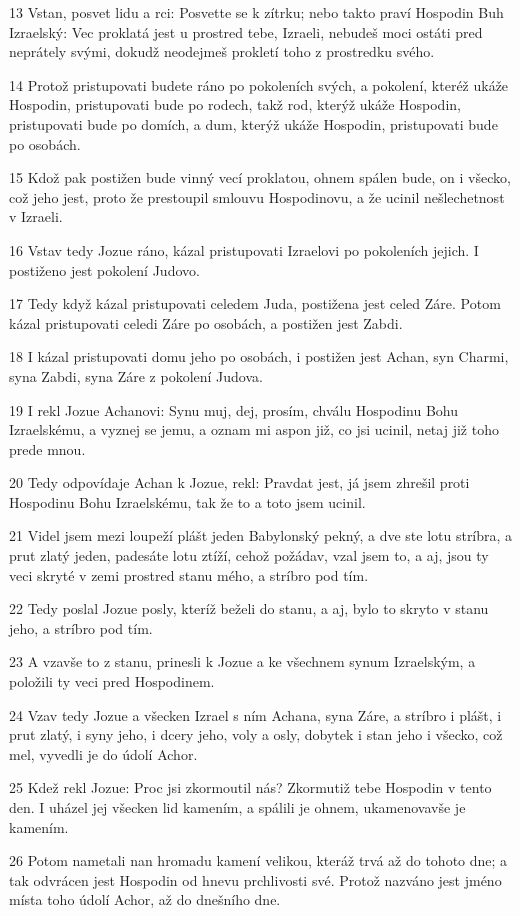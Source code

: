 \par 13 Vstan, posvet lidu a rci: Posvette se k zítrku; nebo takto praví Hospodin Buh Izraelský: Vec proklatá jest u prostred tebe, Izraeli, nebudeš moci ostáti pred neprátely svými, dokudž neodejmeš prokletí toho z prostredku svého.
\par 14 Protož pristupovati budete ráno po pokoleních svých, a pokolení, kteréž ukáže Hospodin, pristupovati bude po rodech, takž rod, kterýž ukáže Hospodin, pristupovati bude po domích, a dum, kterýž ukáže Hospodin, pristupovati bude po osobách.
\par 15 Kdož pak postižen bude vinný vecí proklatou, ohnem spálen bude, on i všecko, což jeho jest, proto že prestoupil smlouvu Hospodinovu, a že ucinil nešlechetnost v Izraeli.
\par 16 Vstav tedy Jozue ráno, kázal pristupovati Izraelovi po pokoleních jejich. I postiženo jest pokolení Judovo.
\par 17 Tedy když kázal pristupovati celedem Juda, postižena jest celed Záre. Potom kázal pristupovati celedi Záre po osobách, a postižen jest Zabdi.
\par 18 I kázal pristupovati domu jeho po osobách, i postižen jest Achan, syn Charmi, syna Zabdi, syna Záre z pokolení Judova.
\par 19 I rekl Jozue Achanovi: Synu muj, dej, prosím, chválu Hospodinu Bohu Izraelskému, a vyznej se jemu, a oznam mi aspon již, co jsi ucinil, netaj již toho prede mnou.
\par 20 Tedy odpovídaje Achan k Jozue, rekl: Pravdat jest, já jsem zhrešil proti Hospodinu Bohu Izraelskému, tak že to a toto jsem ucinil.
\par 21 Videl jsem mezi loupeží plášt jeden Babylonský pekný, a dve ste lotu stríbra, a prut zlatý jeden, padesáte lotu ztíží, cehož požádav, vzal jsem to, a aj, jsou ty veci skryté v zemi prostred stanu mého, a stríbro pod tím.
\par 22 Tedy poslal Jozue posly, kteríž beželi do stanu, a aj, bylo to skryto v stanu jeho, a stríbro pod tím.
\par 23 A vzavše to z stanu, prinesli k Jozue a ke všechnem synum Izraelským, a položili ty veci pred Hospodinem.
\par 24 Vzav tedy Jozue a všecken Izrael s ním Achana, syna Záre, a stríbro i plášt, i prut zlatý, i syny jeho, i dcery jeho, voly a osly, dobytek i stan jeho i všecko, což mel, vyvedli je do údolí Achor.
\par 25 Kdež rekl Jozue: Proc jsi zkormoutil nás? Zkormutiž tebe Hospodin v tento den. I uházel jej všecken lid kamením, a spálili je ohnem, ukamenovavše je kamením.
\par 26 Potom nametali nan hromadu kamení velikou, kteráž trvá až do tohoto dne; a tak odvrácen jest Hospodin od hnevu prchlivosti své. Protož nazváno jest jméno místa toho údolí Achor, až do dnešního dne.

